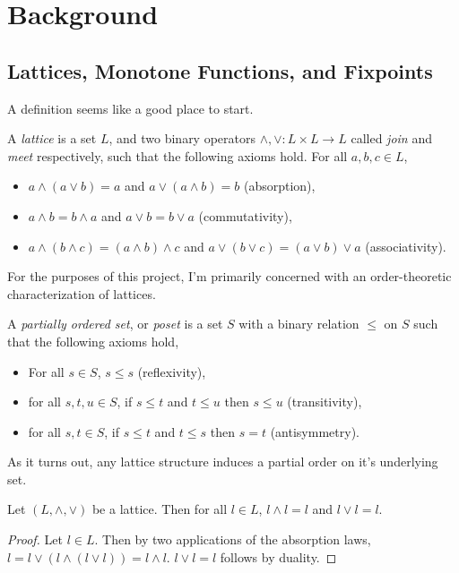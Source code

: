 \chapter{Background}

\section{Lattices, Monotone Functions, and Fixpoints}
A definition seems like a good place to start.
\begin{definition}[Lattice]\label{latedef}
  A \emph{lattice} is a set $L$, and two binary operators $\wedge, \vee : L \times L \to L$ called \emph{join} and \emph{meet} respectively,
  such that the following axioms hold. For all $a, b, c \in L$,
  \begin{itemize}
    \item $a \wedge (a \vee b) = a$ and $a \vee (a \wedge b) = b$ (absorption),
    \item $a \wedge b = b \wedge a$ and $a \vee b = b \vee a$ (commutativity),
    \item $a \wedge (b \wedge c) = (a \wedge b) \wedge c$ and $a \vee (b \vee c) = (a \vee b) \vee a$ (associativity).
  \end{itemize}
\end{definition}
For the purposes of this project, I'm primarily concerned with an order-theoretic characterization of lattices. 
\begin{definition}[Poset]\label{posetdef}
  A \emph{partially ordered set}, or \emph{poset} is a set $S$ with a binary relation $\leq$ on $S$ such that the following axioms hold,
  \begin{itemize}
    \item For all $s \in S$, $s \leq s$ (reflexivity),
    \item for all $s, t, u \in S$, if $s \leq t$ and $t \leq u$ then $s \leq u$ (transitivity),
    \item for all $s, t \in S$, if $s \leq t$ and $t \leq s$ then $s = t$ (antisymmetry).
  \end{itemize}
\end{definition}
As it turns out, any lattice structure induces a partial order on it's underlying set.
\begin{lemma}\label{joinMeetIdempotent}
  Let $(L, \wedge, \vee)$ be a lattice. Then for all $l \in L$, $l \wedge l = l$ and $l \vee l = l$.
\end{lemma}
\begin{proof}
  Let $l \in L$. Then by two applications of the absorption laws, $l = l \vee (l \wedge (l \vee l)) = l \wedge l$. $l \vee l = l$ follows
  by duality.
\end{proof}
